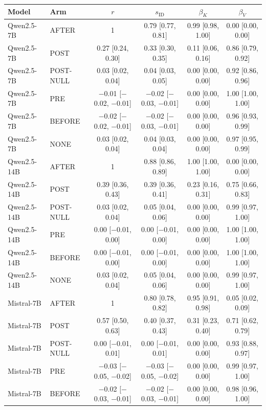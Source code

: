 \begin{tabular}{llcccc}
\toprule
Model & Arm & $r$ & $s_{\mathrm{ID}}$ & $\beta_K$ & $\beta_V$ \\
\midrule
Qwen2.5-7B & AFTER & 1 & 0.79 [0.77, 0.81] & 0.99 [0.98, 1.00] & 0.00 [0.00, 0.00] \\
Qwen2.5-7B & POST & 0.27 [0.24, 0.30] & 0.33 [0.30, 0.35] & 0.11 [0.06, 0.16] & 0.86 [0.79, 0.92] \\
Qwen2.5-7B & POST-NULL & 0.03 [0.02, 0.04] & 0.04 [0.03, 0.05] & 0.00 [0.00, 0.00] & 0.92 [0.86, 0.96] \\
Qwen2.5-7B & PRE & $-$0.01 [$-$0.02, $-$0.01] & $-$0.02 [$-$0.03, $-$0.01] & 0.00 [0.00, 0.00] & 1.00 [1.00, 1.00] \\
Qwen2.5-7B & BEFORE & $-$0.02 [$-$0.02, $-$0.01] & $-$0.02 [$-$0.03, $-$0.01] & 0.00 [0.00, 0.00] & 0.96 [0.93, 0.99] \\
Qwen2.5-7B & NONE & 0.03 [0.02, 0.04] & 0.04 [0.03, 0.04] & 0.00 [0.00, 0.00] & 0.97 [0.95, 0.99] \\
\midrule
Qwen2.5-14B & AFTER & 1 & 0.88 [0.86, 0.89] & 1.00 [1.00, 1.00] & 0.00 [0.00, 0.00] \\
Qwen2.5-14B & POST & 0.39 [0.36, 0.43] & 0.39 [0.36, 0.41] & 0.23 [0.16, 0.31] & 0.75 [0.66, 0.83] \\
Qwen2.5-14B & POST-NULL & 0.03 [0.02, 0.04] & 0.05 [0.04, 0.06] & 0.00 [0.00, 0.00] & 0.99 [0.97, 1.00] \\
Qwen2.5-14B & PRE & 0.00 [$-$0.01, 0.00] & 0.00 [$-$0.01, 0.00] & 0.00 [0.00, 0.00] & 1.00 [1.00, 1.00] \\
Qwen2.5-14B & BEFORE & 0.00 [$-$0.01, 0.00] & 0.00 [$-$0.01, 0.00] & 0.00 [0.00, 0.00] & 1.00 [1.00, 1.00] \\
Qwen2.5-14B & NONE & 0.03 [0.02, 0.04] & 0.05 [0.04, 0.06] & 0.00 [0.00, 0.00] & 0.99 [0.97, 1.00] \\
\midrule
Mistral-7B & AFTER & 1 & 0.80 [0.78, 0.82] & 0.95 [0.91, 0.98] & 0.05 [0.02, 0.09] \\
Mistral-7B & POST & 0.57 [0.50, 0.63] & 0.40 [0.37, 0.43] & 0.31 [0.23, 0.40] & 0.71 [0.62, 0.79] \\
Mistral-7B & POST-NULL & 0.00 [$-$0.01, 0.01] & 0.00 [$-$0.01, 0.01] & 0.00 [0.00, 0.00] & 0.93 [0.88, 0.97] \\
Mistral-7B & PRE & $-$0.03 [$-$0.05, $-$0.02] & $-$0.03 [$-$0.05, $-$0.02] & 0.00 [0.00, 0.00] & 0.99 [0.97, 1.00] \\
Mistral-7B & BEFORE & $-$0.02 [$-$0.03, $-$0.01] & $-$0.02 [$-$0.03, $-$0.01] & 0.00 [0.00, 0.00] & 0.98 [0.96, 1.00] \\

\end{tabular}
